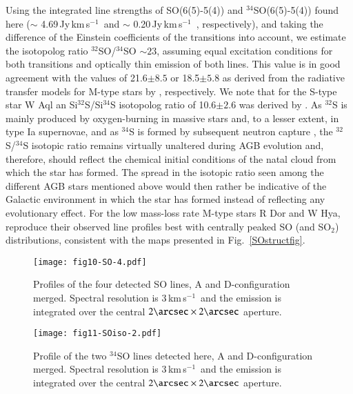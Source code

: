 \documentclass{aa}
\newcommand{\kms}{\,km\,s$^{-1}$~}
\begin{document}
Using the integrated line strengths of SO(6(5)-5(4)) and
$^{34}$SO(6(5)-5(4)) found here ($\sim$ 4.69\,Jy\kms and $\sim$
0.20\,Jy\kms, respectively), and taking the difference of the Einstein
coefficients of the transitions into account, we estimate the
isotopolog ratio $^{32}$SO/$^{34}$SO $\sim 23$, assuming equal
excitation conditions for both transitions and optically thin emission
of both lines. This value is in good agreement with the values of
21.6$\pm8.5$ or 18.5$\pm5.8$ as derived from the radiative transfer
models for M-type stars by \citet{ddbetal2016,2020MNRAS.494.1323D},
respectively.  We note that for the S-type star W Aql an
Si$^{32}$S/Si$^{34}$S isotopolog ratio of 10.6$\pm2.6$ was derived
by \citet{do2020}. As $^{32}$S is mainly produced by oxygen-burning in
massive stars and, to a lesser extent, in type Ia supernovae, and as
$^{34}$S is formed by subsequent neutron capture
\citep[e.g.,][]{1984ApJ...286..644N,1992A&ARv...4....1W,1995ApJS...98..617T,2008MNRAS.390.1710H},
the $^{32}$S/$^{34}$S isotopic ratio remains virtually unaltered
during AGB evolution \citep[see, e.g. tables in the
FRUITY\footnote{http://fruity.oa-teramo.inaf.it/}
database,][]{2011ApJS..197...17C} and, therefore, should reflect the
chemical initial conditions of the natal cloud from which the star has
formed. The spread in the isotopic ratio seen among the different AGB
stars mentioned above would then rather be indicative of the Galactic
environment in which the star  has formed \citep[see,
e.g.,][]{1996A&A...305..960C,2020A&A...642A.222H} instead of
reflecting any evolutionary effect. For the low mass-loss rate M-type
stars R Dor and W Hya, \citet{ddbetal2016} reproduce their observed
line profiles best with centrally peaked SO (and SO$_2$)
distributions, consistent with the maps presented in
Fig.~\ref{SOstructfig}.

\begin{figure}[h]
    \centering
    \texttt{[image: fig10-SO-4.pdf]}
    \caption{Profiles of the four detected SO lines, 
             A and D-configuration merged.
             Spectral resolution is 3\kms and the emission is integrated 
             over the central $2\arcsec \times 2\arcsec$ aperture.}
    \label{solinesfig}
\end{figure}

\begin{figure}[h]
    \centering
    \vspace{-3.0cm}
    \texttt{[image: fig11-SOiso-2.pdf]}
    \caption{Profile of the two $^{34}$SO lines detected here, A and 
             D-configuration merged.
             Spectral resolution is 3\kms and the emission is integrated 
             over the central $2\arcsec \times 2\arcsec$ aperture.}
    \label{soisolinesfig}
\end{figure}
\end{document}
